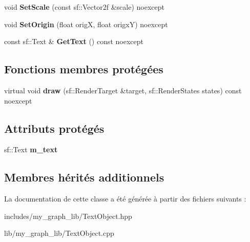 \begin{DoxyCompactItemize}
\mbox{\label{classmy_1_1TextObject_a7c40c8ac5e3d1400dc09f11634986e32}} 
void {\bfseries Set\+Scale} (const sf\+::\+Vector2f \&scale) noexcept
\item 
\mbox{\label{classmy_1_1TextObject_a52cbdf029fb1197a4e4820713325e0c7}} 
void {\bfseries Set\+Origin} (float origX, float origxY) noexcept
\item 
\mbox{\label{classmy_1_1TextObject_aa57b37a35c4b47f52532c36b1de7016b}} 
const sf\+::\+Text \& {\bfseries Get\+Text} () const noexcept
\end{DoxyCompactItemize}
\subsection*{Fonctions membres protégées}
\begin{DoxyCompactItemize}
\item 
\mbox{\label{classmy_1_1TextObject_aaa3cb42fe369ae9c6f8d1f4e495b3d7b}} 
virtual void {\bfseries draw} (sf\+::\+Render\+Target \&target, sf\+::\+Render\+States states) const noexcept
\end{DoxyCompactItemize}
\subsection*{Attributs protégés}
\begin{DoxyCompactItemize}
\item 
\mbox{\label{classmy_1_1TextObject_aa00d09e7bbea62c94333d54ef500e11d}} 
sf\+::\+Text {\bfseries m\+\_\+text}
\end{DoxyCompactItemize}
\subsection*{Membres hérités additionnels}


La documentation de cette classe a été générée à partir des fichiers suivants \+:\begin{DoxyCompactItemize}
\item 
includes/my\+\_\+graph\+\_\+lib/Text\+Object.\+hpp\item 
lib/my\+\_\+graph\+\_\+lib/Text\+Object.\+cpp\end{DoxyCompactItemize}
